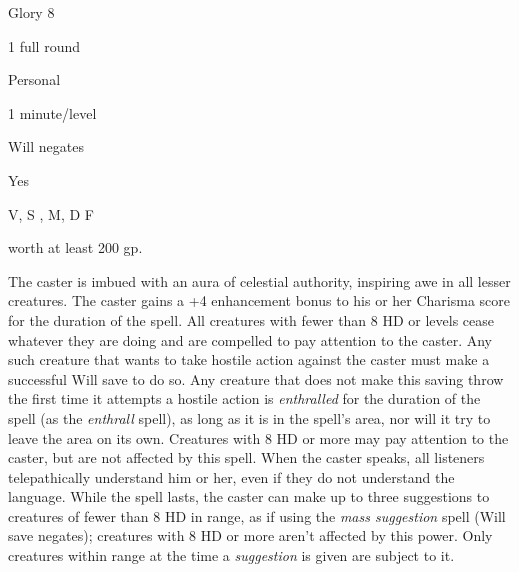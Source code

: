 
\begin{description*}
\item[Level:] Glory 8
\item[Casting Time:] 1 full round
\item[Range:] Personal
\item[Duration:] 1 minute/level
\item[Saving Throw:] Will negates
\item[Spell Resistance:] Yes
\item[Components:] V, S , M, D F
\item[Arcane Material Component:] worth at least 200 gp.
\end{description*}

The caster is imbued with an aura of celestial authority, inspiring awe in all
lesser creatures.
The caster gains a +4 enhancement bonus to his or her Charisma score for the duration
of the spell. All creatures with fewer than 8 HD or levels cease whatever they
are doing and are compelled to pay attention to the caster. Any such creature that
wants to take hostile action against the caster must make a successful Will save
to do so. Any creature that does not make this saving throw the first time it attempts
a hostile action is \textit{enthralled} for the duration of the spell (as the \textit{enthrall
}spell), as long as it is in the spell's area, nor will it try to leave the area
on its own. Creatures with 8 HD or more may pay attention to the caster, but are
not affected by this spell.
When the caster speaks, all listeners telepathically understand him or her, even
if they do not understand the language. While the spell lasts, the caster can make
up to three suggestions to creatures of fewer than 8 HD in range, as if using the
\textit{mass suggestion} spell (Will save negates); creatures with 8 HD or more
aren't affected by this power. Only creatures within range at the time a \textit{suggestion
}is given are subject to it.